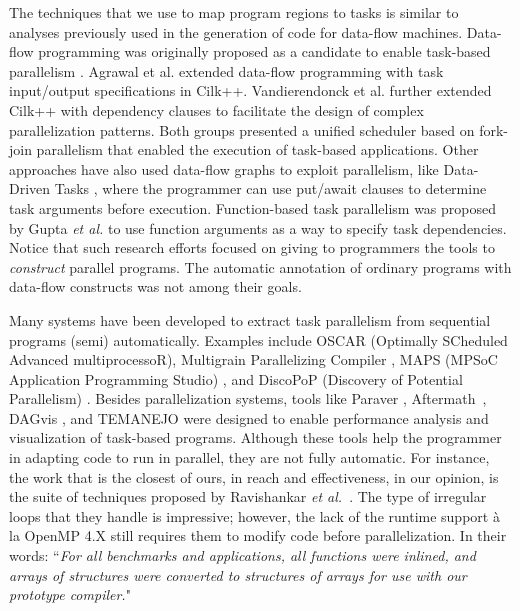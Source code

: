 \documentclass[sigplan,10pt,review,anonymous]{acmart}
\begin{document}
The techniques that we use to map program regions to tasks is similar to
analyses previously used in the generation of code for data-flow machines.
Data-flow programming was originally proposed as a candidate to enable
task-based parallelism \cite{agrawal:ipdps:2010, chan:spaa:2007,
gupta:micro:2011}.  Agrawal et al. \cite{agrawal:ipdps:2010}  extended
data-flow programming  with task input/output specifications in  Cilk++.
Vandierendonck et al.  \cite{vandierendonck:hotpar:2011} further extended Cilk++
with dependency clauses to facilitate the design of complex
parallelization patterns. Both groups presented a unified scheduler based on
fork-join parallelism \cite{vandierendonck:pact:2011} that enabled the
execution of task-based applications. Other approaches have also used
data-flow graphs to exploit parallelism, like Data-Driven Tasks
\cite{tasirlar:icpp:2011}, where the programmer can use put/await clauses to
determine task arguments before execution.
Function-based task parallelism was proposed by Gupta {\em et al.}
\cite{gupta:micro:2011} to use function arguments  as a way to
specify task  dependencies.
Notice that such research efforts focused on giving to programmers the tools to
{\em construct} parallel programs.
The automatic annotation of ordinary programs with data-flow constructs was not
among their goals.

Many systems have been developed to extract task parallelism from sequential
programs (semi) automatically.
Examples include OSCAR
(Optimally SCheduled Advanced multiprocessoR), Multigrain Parallelizing
Compiler \cite{ishizaka:journal:2000, kasahara:iwlcpc:2000},  MAPS (MPSoC
Application Programming  Studio) \cite{castrillon:tii:2013, ceng:dac:2008}, and
DiscoPoP (Discovery of Potential Parallelism) \cite{discopop, li:jss:2016}.
Besides parallelization systems, tools like Paraver \cite{extrae, paraver},
Aftermath~\cite{drebes:hipeac:2014}, DAGvis \cite{huynh:wvpa:2015}, and TEMANEJO
\cite{brinkmann:parco:2011, brinkmann:journal:2013, temanejo} were  designed to
enable performance analysis and visualization of task-based programs.
Although these tools help the programmer in adapting code
to run in parallel, they are not fully automatic.
For instance, the work that is the closest of ours, in reach and effectiveness,
in our opinion, is the suite of techniques proposed by Ravishankar {\em et
al.}~\cite{Ravishankar14}.
The type of irregular loops that they handle is impressive; however,
the lack of the runtime support \`{a} la OpenMP 4.X still requires them to
modify code before parallelization.
In their words: ``{\em For all benchmarks and applications, all functions were 
inlined, and arrays of structures were converted to structures of arrays for use
with our prototype compiler.}"
\end{document}
